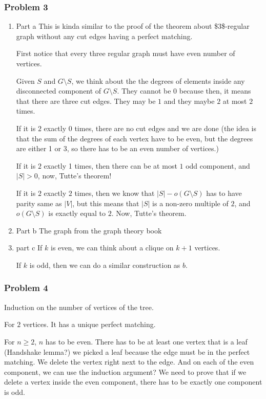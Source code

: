 \documentclass[11pt]{article}
\begin{document}
\subsubsection{Problem 3}
\label{sec:org94e9505}
\begin{enumerate}
\item Part a
\label{sec:org8b70543}
This is kinda similar to the proof of the theorem about \$3\$-regular graph
without any cut edges having a perfect matching. 

First notice that every three regular graph must have even number of
vertices.

Given \(S\) and \(G\setminus S\), we think about the the degrees of elements
inside any disconnected component of \(G \setminus S\). They cannot be \(0\)
because then, it means that there are three cut edges. They may be \(1\) and
they maybe \(2\) at most \(2\) times.

If it is \(2\) exactly 0 times, there are no cut edges and we are done (the
idea is that the sum of the degrees of each vertex have to be even, but the
degrees are either 1 or 3, so there has to be an even number of vertices.)

If it is \(2\) exactly 1 times, then there can be at most \(1\) odd component,
and \(\vert S\vert > 0\), now, Tutte's theorem!

If it is \(2\) exactly \(2\) times, then we know that \(\vert S \vert -
     o(G\setminus S)\) has to have parity same as \(\vert V\vert\), but this means
that \(\vert S\vert\) is a non-zero multiple of \(2\), and \(o(G \setminus S)\)
is exactly equal to \(2\). Now, Tutte's theorem.     
\item Part b
\label{sec:orgaa46404}
The graph from the graph theory book
\item part c
\label{sec:orga69eedb}
If \(k\) is even, we can think about a clique on \(k+1\) vertices.

If \(k\) is odd, then we can do a similar construction as \(b\).
\end{enumerate}
\subsubsection{Problem 4}
\label{sec:org7378925}
Induction on the number of vertices of the tree.

For \(2\) vertices. It has a unique perfect matching.

For \(n \ge 2\), \(n\) has to be even. There has to be at least one vertex that
is a leaf (Handshake lemma?) we picked a leaf because the edge must be in
the perfect matching. We delete the vertex right next to the edge. And on
each of the even component, we can use the induction argument? We need to
prove that if we delete a vertex inside the even component, there has to be
exactly one component is odd. 
\end{document}
